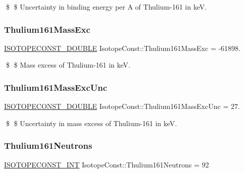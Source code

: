 \$ \$ Uncertainty in binding energy per A of Thulium-\/161 in keV. \mbox{\label{group___isotope_const-_thulium-_tm161_ga3ddbafce4786298c49f8a5f80bd33d99}} 
\subsubsection{\texorpdfstring{Thulium161\+Mass\+Exc}{Thulium161MassExc}}
{\footnotesize\ttfamily \mbox{\hyperlink{group___isotope_const-_macros_ga8f45a7272ce02c0b4c65c44636ed719a}{I\+S\+O\+T\+O\+P\+E\+C\+O\+N\+S\+T\+\_\+\+D\+O\+U\+B\+LE}} Isotope\+Const\+::\+Thulium161\+Mass\+Exc = -\/61898.}

\$ \$ Mass excess of Thulium-\/161 in keV. \mbox{\label{group___isotope_const-_thulium-_tm161_ga9e9cba54789c61f8fae99813a1fa6d5a}} 
\subsubsection{\texorpdfstring{Thulium161\+Mass\+Exc\+Unc}{Thulium161MassExcUnc}}
{\footnotesize\ttfamily \mbox{\hyperlink{group___isotope_const-_macros_ga8f45a7272ce02c0b4c65c44636ed719a}{I\+S\+O\+T\+O\+P\+E\+C\+O\+N\+S\+T\+\_\+\+D\+O\+U\+B\+LE}} Isotope\+Const\+::\+Thulium161\+Mass\+Exc\+Unc = 27.}

\$ \$ Uncertainty in mass excess of Thulium-\/161 in keV. \mbox{\label{group___isotope_const-_thulium-_tm161_ga3b24268eadef2c029cf16b83d5e4573c}} 
\subsubsection{\texorpdfstring{Thulium161\+Neutrons}{Thulium161Neutrons}}
{\footnotesize\ttfamily \mbox{\hyperlink{group___isotope_const-_macros_ga5f18360b3e99483a35c32d789e62621c}{I\+S\+O\+T\+O\+P\+E\+C\+O\+N\+S\+T\+\_\+\+I\+NT}} Isotope\+Const\+::\+Thulium161\+Neutrons = 92}

